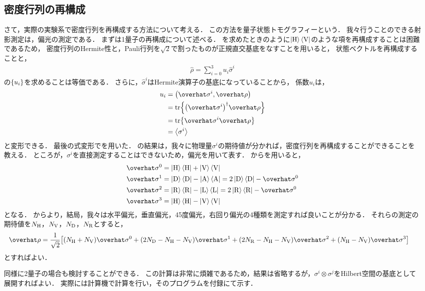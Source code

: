 \documentclass{report}
\begin{document}
  \subsection{密度行列の再構成}
    さて，実際の実験系で密度行列を再構成する方法について考える．
    この方法を量子状態トモグラフィーという．
    我々行うことのできる射影測定は，偏光の測定である．
    まずは1量子の再構成について述べる．
    を求めたときのように$\ket{\mathrm{H}}\bra{\mathrm{V}}$のような項を再構成することは困難であるため，
    密度行列のHermite性と，Pauli行列を$\sqrt{2}$で割ったものが正規直交基底をなすことを用いると，
    状態ベクトルを再構成することと，
    \begin{align}
      \hat{\rho} = \sum_{i = 0}^{3}u_i\hat{\sigma}^i
    \end{align}
    の$\qty{u_i}$を求めることは等価である．
    さらに，$\hat{\sigma}^i$はHermite演算子の基底になっていることから，
    係数$u_i$は，
    \begin{align}
      u_i &= \qty(\hat{\sigma}^i, \hat{\rho}) \\ 
      &= \tr{\qty(\hat{\sigma}^i)^{\dag}\hat{\rho}} \\ 
      &= \tr{\hat{\sigma}^i\hat{\rho}} \\ 
      &= \ev{\sigma^i} \label{1-bit-qst-u}
    \end{align}
    と変形できる．
    最後の式変形でを用いた．
    の結果は，我々に物理量$\sigma^i$の期待値が分かれば，密度行列を再構成することができることを教える．
    ところが，$\sigma^i$を直接測定することはできないため，偏光を用いて表す．
    からを用いると，
    \begin{align}
      \hat{\sigma}^0 &= \ketH\braH + \ketV\braV \label{sigma-0-uses-polarization} \\ 
      \hat{\sigma}^1 &= \ketD\braD - \ketA\braA = 2\ketD\braD - \hat{\sigma}^0 \label{sigma-1-uses-polarization} \\ 
      \hat{\sigma}^2 &= \ketR\braR - \ketL\braL = 2\ketR\braR - \hat{\sigma}^0 \label{sigma-2-uses-polarization} \\ 
      \hat{\sigma}^3 &= \ketH\braH - \ketV\braV\label{sigma-3-uses-polarization}
    \end{align}
    となる．
    からより，結局，我々は水平偏光，垂直偏光，45度偏光，右回り偏光の4種類を測定すれば良いことが分かる．
    それらの測定の期待値を$N_{\mathrm{H}}$，$N_{\mathrm{V}}$，$N_{\mathrm{D}}$，$N_{\mathrm{R}}$とすると，
    \begin{align}
      \hat{\rho} &= \frac{1}{\sqrt{2}}\qty[(N_{\r{H}} + N_{\r{V}})\hat{\sigma}^0 + (2N_{\r{D}} - N_{\r{H}} - N_{\r{V}})\hat{\sigma}^1 + (2N_{\r{R}} - N_{\r{H}} - N_{\r{V}})\hat{\sigma}^2 + (N_{\r{H}} - N_{\r{V}})\hat{\sigma}^3]
    \end{align}
    とすればよい．
    \par
    同様に2量子の場合も検討することができる．
    この計算は非常に煩雑であるため，結果は省略するが，$\sigma^i\otimes\sigma^j$をHilbert空間の基底として展開すればよい．
    実際には計算機で計算を行い，そのプログラムを付録にて示す．
\end{document}
